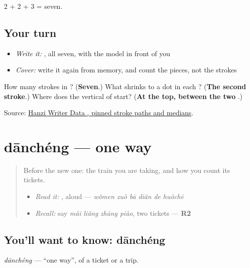 2 + 2 + 3 = seven.

\subsection*{Your turn}
\begin{itemize}
\raggedright
  \item \emph{Write it:} , all seven, with the model in front of you
  \item \emph{Cover:} write it again from memory, and count the pieces, not the strokes
\end{itemize}

\begin{tcolorbox}[breakable,colback=teal!4,colframe=teal!35!black,title={Before you move on}]
How many strokes in ? (\textbf{Seven}.) What shrinks to a dot in each ? (\textbf{The second stroke}.) Where does the vertical of  start? (\textbf{At the top, between the two }.)

Source: \href{https://raw.githubusercontent.com/chanind/hanzi-writer-data/68d10a4b21150cae5e1ebbd223eed289cf32d90c/data/\%E5\%9D\%90.json}{Hanzi Writer Data , pinned stroke paths and medians}.
\end{tcolorbox}
\section[dānchéng]{dānchéng — one way}

\label{lesson:ZH-C284-dancheng}



\begin{quote}
Before the new one: the train you are taking, and how you count its tickets.

\begin{itemize}
\raggedright
  \item \emph{Read it:} , aloud — \emph{wǒmen zuò bā diǎn de huǒchē}
  \item \emph{Recall:} say \emph{mǎi liǎng zhāng piào}, two tickets — \textbf{R2}
\end{itemize}
\end{quote}

\subsection*{You'll want to know: dānchéng}
\emph{dānchéng} — \textquotedblleft{}one way\textquotedblright{}, of a ticket or a trip.

